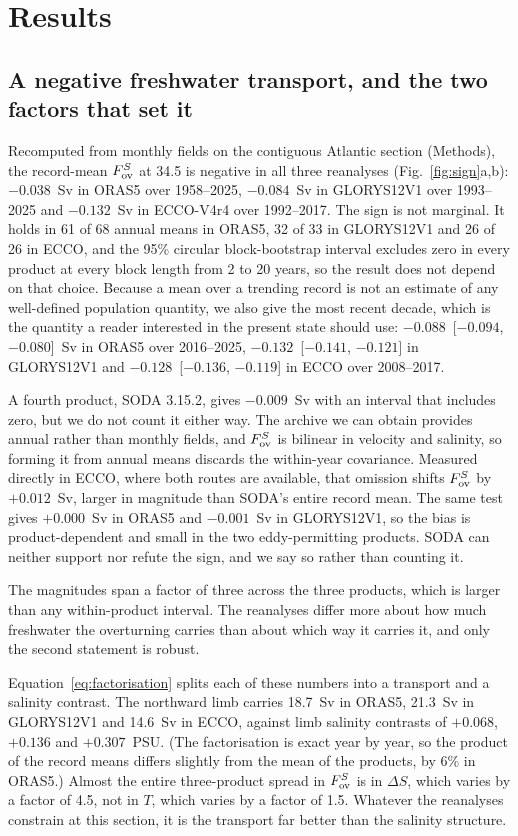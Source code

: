 \section*{Results}

\subsection*{A negative freshwater transport, and the two factors that set it}

Recomputed from monthly fields on the contiguous Atlantic section
(Methods), the record-mean $F_{\mathrm{ov}}^{S}$ at 34.5\degS{} is negative in all three
reanalyses (Fig.~\ref{fig:sign}a,b): $-0.038$~Sv in ORAS5 over 1958--2025,
$-0.084$~Sv in GLORYS12V1 over 1993--2025 and $-0.132$~Sv in ECCO-V4r4 over
1992--2017. The sign is not marginal. It holds in 61 of 68 annual means in
ORAS5, 32 of 33 in GLORYS12V1 and 26 of 26 in ECCO, and the 95\% circular
block-bootstrap interval excludes zero in every product at every block length
from 2 to 20 years, so the result does not depend on that choice. Because a
mean over a trending record is not an estimate of any well-defined population
quantity, we also give the most recent decade, which is the quantity a reader
interested in the present state should use: $-0.088$~[$-0.094$, $-0.080$]~Sv in
ORAS5 over 2016--2025, $-0.132$~[$-0.141$, $-0.121$] in GLORYS12V1 and
$-0.128$~[$-0.136$, $-0.119$] in ECCO over 2008--2017.

A fourth product, SODA 3.15.2, gives $-0.009$~Sv with an interval that includes
zero, but we do not count it either way. The archive we can obtain provides
annual rather than monthly fields, and $F_{\mathrm{ov}}^{S}$ is bilinear in velocity and
salinity, so forming it from annual means discards the within-year covariance.
Measured directly in ECCO, where both routes are available, that omission shifts
$F_{\mathrm{ov}}^{S}$ by $+0.012$~Sv, larger in magnitude than SODA's entire record mean. The
same test gives $+0.000$~Sv in ORAS5 and $-0.001$~Sv in GLORYS12V1, so the bias
is product-dependent and small in the two eddy-permitting products. SODA can
neither support nor refute the sign, and we say so rather than counting it.

The magnitudes span a factor of three across the three products, which is
larger than any within-product interval. The reanalyses differ more about how
much freshwater the overturning carries than about which way it carries it, and
only the second statement is robust.

Equation~\eqref{eq:factorisation} splits each of these numbers into a transport
and a salinity contrast. The northward limb carries 18.7~Sv in ORAS5, 21.3~Sv
in GLORYS12V1 and 14.6~Sv in ECCO, against limb salinity contrasts of $+0.068$,
$+0.136$ and $+0.307$~PSU. (The factorisation is exact year by year, so the
product of the record means differs slightly from the mean of the products, by
6\% in ORAS5.) Almost the entire three-product spread in $F_{\mathrm{ov}}^{S}$ is in
$\Delta S$, which varies by a factor of 4.5, not in $T$, which varies by a
factor of 1.5. Whatever the reanalyses constrain at this section, it is the
transport far better than the salinity structure.

